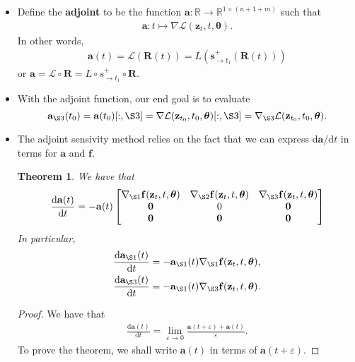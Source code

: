 \documentclass[10pt]{article}
\newtheorem{theorem}[lemma]{Theorem}
\newcommand{\dee}{\mathrm{d}}
\newcommand{\ve}[1]{\mathbf{#1}}
\newcommand{\ves}[1]{\boldsymbol{#1}}
\newcommand{\mcal}[1]{\mathcal{#1}}
\newcommand{\Real}{\mathbb{R}}
\begin{document}
\begin{itemize}
  \item Define the {\bf adjoint} to be the function $\ve{a}: \Real \rightarrow \Real^{1 \times (n+1+m)}$ such that
  \begin{align*}
    \ve{a}: t \mapsto \nabla \mcal{L}(\ve{z}_t, t, \ves{\theta}).
  \end{align*}
  In other words,
  \begin{align*}
    \ve{a}(t) = \mcal{L}(\ve{R}(t)) = L(\ve{s}^+_{\rightarrow t_1}(\ve{R}(t)))
  \end{align*}
  or $\ve{a} = \mcal{L} \circ \ve{R} = L \circ s_{\rightarrow t_1}^+ \circ \ve{R}$.

  \item With the adjoint function, our end goal is to evaluate $$\ve{a}_{\S3}(t_0) 
  = \ve{a}(t_0)[:,\S3] 
  = \nabla \mcal{L}(\ve{z}_{t_0}, t_0, \ves{\theta})[:, \S3] 
  = \nabla_{\S3}\mcal{L}(\ve{z}_{t_0}, t_0, \ves{\theta}).$$

  \item The adjoint sensivity method relies on the fact that we can express $\dee\ve{a} / \dee t$ in terms for $\ve{a}$ and $\ve{f}$.
  \begin{theorem} \label{thm:adjoint-deriv}
  We have that
  \begin{align*}
    \frac{\dee \ve{a}(t)}{\dee t}
    = -\ve{a}(t)
    \begin{bmatrix}
      \nabla_{\S1}\ve{f}(\ve{z}_t, t, \ves{\theta})
      & \nabla_{\S2}\ve{f}(\ve{z}_t, t, \ves{\theta})
      & \nabla_{\S3}\ve{f}(\ve{z}_t, t, \ves{\theta}) \\
      \ve{0} & 0 & \ve{0} \\
      \ve{0} & \ve{0} & \ve{0}
    \end{bmatrix}
  \end{align*}
  In particular,
  \begin{align*}
    \frac{ \dee \ve{a}_{\S 1}(t)}{\dee t} &= -\ve{a}_{\S1}(t) \nabla_{\S1}\ve{f}(\ve{z}_t, t, \ves{\theta}), \\
    \frac{ \dee \ve{a}_{\S 3}(t)}{\dee t} &= -\ve{a}_{\S1}(t) \nabla_{\S3}\ve{f}(\ve{z}_t, t, \ves{\theta}). \\
  \end{align*}
  \end{theorem}

  \begin{proof}
    We have that 
    \begin{align*}
      \frac{\dee \ve{a}(t)}{\dee t} = \lim_{\varepsilon \rightarrow 0} \frac{\ve{a}(t + \varepsilon) + \ve{a}(t)}{\varepsilon}.
    \end{align*}
    To prove the theorem, we shall write $\ve{a}(t)$ in terms of $\ve{a}(t+\varepsilon)$.


\end{proof}
\end{itemize}
\end{document}
